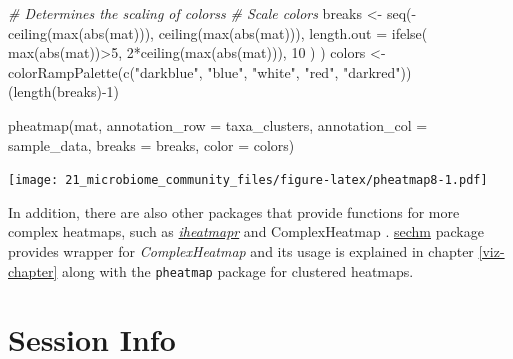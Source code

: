\documentclass[
]{book}
\newenvironment{Shaded}{\begin{snugshade}}{\end{snugshade}}
\newcommand{\AttributeTok}[1]{\textcolor[rgb]{0.77,0.63,0.00}{#1}}
\newcommand{\CommentTok}[1]{\textcolor[rgb]{0.56,0.35,0.01}{\textit{#1}}}
\newcommand{\DecValTok}[1]{\textcolor[rgb]{0.00,0.00,0.81}{#1}}
\newcommand{\FunctionTok}[1]{\textcolor[rgb]{0.00,0.00,0.00}{#1}}
\newcommand{\NormalTok}[1]{#1}
\newcommand{\OtherTok}[1]{\textcolor[rgb]{0.56,0.35,0.01}{#1}}
\newcommand{\SpecialCharTok}[1]{\textcolor[rgb]{0.00,0.00,0.00}{#1}}
\newcommand{\StringTok}[1]{\textcolor[rgb]{0.31,0.60,0.02}{#1}}
\begin{document}
\begin{Shaded}
\begin{Highlighting}[]
\CommentTok{\# Determines the scaling of colorss}
\CommentTok{\# Scale colors}
\NormalTok{breaks }\OtherTok{\textless{}{-}} \FunctionTok{seq}\NormalTok{(}\SpecialCharTok{{-}}\FunctionTok{ceiling}\NormalTok{(}\FunctionTok{max}\NormalTok{(}\FunctionTok{abs}\NormalTok{(mat))), }\FunctionTok{ceiling}\NormalTok{(}\FunctionTok{max}\NormalTok{(}\FunctionTok{abs}\NormalTok{(mat))), }
              \AttributeTok{length.out =} \FunctionTok{ifelse}\NormalTok{( }\FunctionTok{max}\NormalTok{(}\FunctionTok{abs}\NormalTok{(mat))}\SpecialCharTok{\textgreater{}}\DecValTok{5}\NormalTok{, }\DecValTok{2}\SpecialCharTok{*}\FunctionTok{ceiling}\NormalTok{(}\FunctionTok{max}\NormalTok{(}\FunctionTok{abs}\NormalTok{(mat))), }\DecValTok{10}\NormalTok{ ) )}
\NormalTok{colors }\OtherTok{\textless{}{-}} \FunctionTok{colorRampPalette}\NormalTok{(}\FunctionTok{c}\NormalTok{(}\StringTok{"darkblue"}\NormalTok{, }\StringTok{"blue"}\NormalTok{, }\StringTok{"white"}\NormalTok{, }\StringTok{"red"}\NormalTok{, }\StringTok{"darkred"}\NormalTok{))(}\FunctionTok{length}\NormalTok{(breaks)}\SpecialCharTok{{-}}\DecValTok{1}\NormalTok{)}

\FunctionTok{pheatmap}\NormalTok{(mat, }\AttributeTok{annotation\_row =}\NormalTok{ taxa\_clusters, }
         \AttributeTok{annotation\_col =}\NormalTok{ sample\_data,}
         \AttributeTok{breaks =}\NormalTok{ breaks,}
         \AttributeTok{color =}\NormalTok{ colors)}
\end{Highlighting}
\end{Shaded}

\texttt{[image: 21\_microbiome\_community\_files/figure-latex/pheatmap8-1.pdf]}

In addition, there are also other packages that provide functions for
more complex heatmaps, such as
\href{https://docs.ropensci.org/iheatmapr/articles/full_vignettes/iheatmapr.html}{\emph{iheatmapr}}
and ComplexHeatmap \citep{ComplexHeatmap}.
\href{http://www.bioconductor.org/packages/release/bioc/vignettes/sechm/inst/doc/sechm.html}{sechm}
package provides wrapper for \emph{ComplexHeatmap} and its usage is
explained in chapter \ref{viz-chapter} along with the \texttt{pheatmap}
package for clustered heatmaps.

\hypertarget{session-info-6}{%
\section*{Session Info}\label{session-info-6}}
\end{document}
